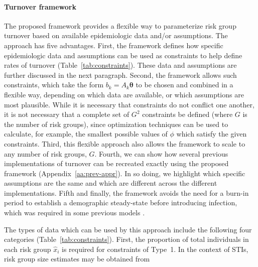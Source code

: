 \paragraph{Turnover framework}
The proposed framework provides a flexible way to parameterize risk group turnover
based on available epidemiologic data and/or assumptions.
The approach has five advantages.
First, the framework defines how specific epidemiologic data and assumptions
can be used as constraints to help define rates of turnover
(Table~\ref{tab:constraints}).
These data and assumptions are further discussed in the next paragraph.
Second, the framework allows such constraints,
which take the form $b_k = A_k \bm{\theta}$
to be chosen and combined in a flexible way,
depending on which data are available, or which assumptions are most plausible.
While it is necessary that constraints do not conflict one another,
it is not necessary that a complete set of $G^2$ constraints be defined
(where $G$ is the number of risk groups),
since optimization techniques can be used to calculate, for example,
the smallest possible values of $\phi$ which satisfy the given constraints.
Third, this flexible approach also allows the framework to scale
to any number of risk groups, $G$.
Fourth, we can show how several previous implementations of turnover
\citep{Stigum1994,Eaton2014,Henry2015}
can be recreated exactly using the proposed framework
(Appendix~\ref{aa:prev-appr}).
In so doing, we highlight which specific assumptions are
the same and which are different across the different implementations.
Fifth and finally, the framework avoids the need for a burn-in period
to establish a demographic steady-state before introducing infection,
which was required in some previous models \citep{Boily2015}.
\par
The types of data which can be used by this approach include the following four categories
(Table~\ref{tab:constraints}).
First, the proportion of total individuals in each risk group $\hat{x}_i$ is required
for constraints of Type~1.
In the context of STIs, risk group size estimates may be obtained from
